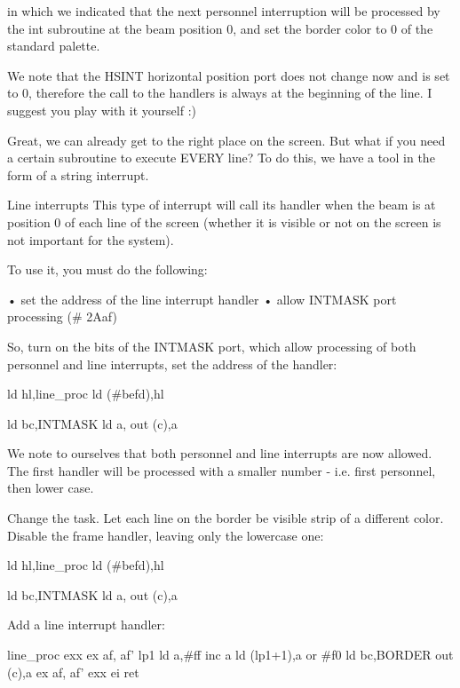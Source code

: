 in which we indicated that the next personnel interruption will be processed by
the int subroutine at the beam position 0, and set the border color to 0 of the
standard palette.

We note that the HSINT horizontal position port does not change now and is set
to 0, therefore the call to the handlers is always at the beginning of the
line. I suggest you play with it yourself :)

Great, we can already get to the right place on the screen. But what if you
need a certain subroutine to execute EVERY line?
To do this, we have a tool in the form of a string interrupt.

Line interrupts
This type of interrupt will call its handler when the beam is at position 0 of
each line of the screen (whether it is visible or not on the screen is not
important for the system).

To use it, you must do the following:

  • set the address of the line interrupt handler
  • allow INTMASK port processing (# 2Aaf)


So, turn on the bits of the INTMASK port, which allow processing of both
personnel and line interrupts, set the address of the handler:

                ld      hl,line_proc
                ld      (#befd),hl

                ld      bc,INTMASK
                ld      a,%
                out     (c),a


We note to ourselves that both personnel and line interrupts are now allowed.
The first handler will be processed with a smaller number - i.e. first
personnel, then lower case.

Change the task. Let each line on the border be visible strip of a different
color.
Disable the frame handler, leaving only the lowercase one:

                ld      hl,line_proc
                ld      (#befd),hl

                ld      bc,INTMASK
                ld      a,%
                out     (c),a



Add a line interrupt handler:

line_proc
                exx
                ex af, af'
lp1             ld a,#ff
                inc a
                ld (lp1+1),a
                or #f0
                ld bc,BORDER
                out (c),a
                ex af, af'
                exx
                ei
                ret


